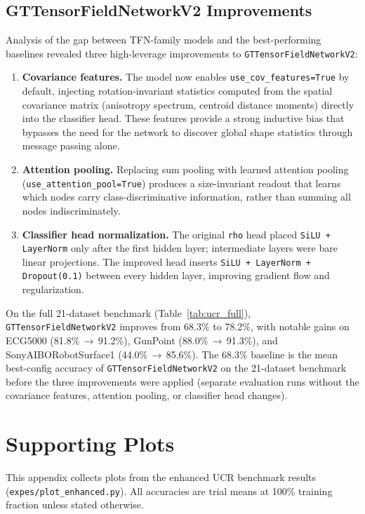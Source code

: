 \documentclass[a4paper,11pt]{article}
\begin{document}
\subsection{GTTensorFieldNetworkV2 Improvements}

Analysis of the gap between TFN-family models and the best-performing baselines revealed three high-leverage improvements to \texttt{GTTensorFieldNetworkV2}:

\begin{enumerate}
    \item \textbf{Covariance features.}
    The model now enables \texttt{use\_cov\_features=True} by default, injecting rotation-invariant statistics computed from the spatial covariance matrix (anisotropy spectrum, centroid distance moments) directly into the classifier head.
    These features provide a strong inductive bias that bypasses the need for the network to discover global shape statistics through message passing alone.
    \item \textbf{Attention pooling.}
    Replacing sum pooling with learned attention pooling (\texttt{use\_attention\_pool=True}) produces a size-invariant readout that learns which nodes carry class-discriminative information, rather than summing all nodes indiscriminately.
    \item \textbf{Classifier head normalization.}
    The original \texttt{rho} head placed \texttt{SiLU\,+\,LayerNorm} only after the first hidden layer; intermediate layers were bare linear projections. The improved head inserts \texttt{SiLU\,+\,LayerNorm\,+\,Dropout(0.1)} between every hidden layer, improving gradient flow and regularization.
\end{enumerate}

On the full 21-dataset benchmark (Table~\ref{tab:ucr_full}), \texttt{GTTensorFieldNetworkV2} improves from 68.3\% to 78.2\%, with notable gains on ECG5000 (81.8\%\,$\to$\,91.2\%), GunPoint (88.0\%\,$\to$\,91.3\%), and SonyAIBORobotSurface1 (44.0\%\,$\to$\,85.6\%).
The 68.3\% baseline is the mean best-config accuracy of \texttt{GTTensorFieldNetworkV2} on the 21-dataset benchmark before the three improvements were applied (separate evaluation runs without the covariance features, attention pooling, or classifier head changes).

\section*{Supporting Plots}

This appendix collects plots from the enhanced UCR benchmark results (\texttt{expes/plot\_enhanced.py}).
All accuracies are trial means at 100\% training fraction unless stated otherwise.
\end{document}
